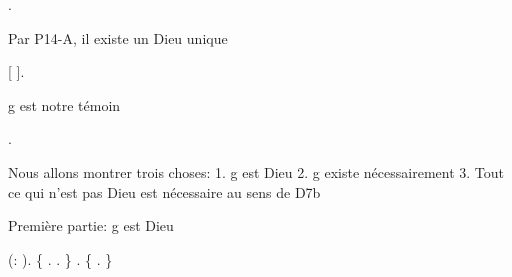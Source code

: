 \documentclass[10pt]{report}
\begin{document}
\begin{coqdoccode}
\coqdocnoindent
{}.\coqdoceol
\coqdocindent{1.00em}
\begin{coqdoccomment}
\coqdocindent{0.50em}
Par\coqdocindent{0.50em}
P14-A,\coqdocindent{0.50em}
il\coqdocindent{0.50em}
existe\coqdocindent{0.50em}
un\coqdocindent{0.50em}
Dieu\coqdocindent{0.50em}
unique\coqdocindent{0.50em}
\end{coqdoccomment}
\coqdoceol
\coqdocindent{1.00em}
   [ ].\coqdoceol
\coqdocemptyline
\coqdocindent{1.00em}
\begin{coqdoccomment}
\coqdocindent{0.50em}
g\coqdocindent{0.50em}
est\coqdocindent{0.50em}
notre\coqdocindent{0.50em}
témoin\coqdocindent{0.50em}
\end{coqdoccomment}
\coqdoceol
\coqdocindent{1.00em}
\coqdoctac{\ensuremath{\exists}} .\coqdoceol
\coqdocemptyline
\coqdocindent{1.00em}
\begin{coqdoccomment}
\coqdocindent{0.50em}
Nous\coqdocindent{0.50em}
allons\coqdocindent{0.50em}
montrer\coqdocindent{0.50em}
trois\coqdocindent{0.50em}
choses:\coqdoceol
\coqdocindent{2.50em}
1.\coqdocindent{0.50em}
g\coqdocindent{0.50em}
est\coqdocindent{0.50em}
Dieu\coqdoceol
\coqdocindent{2.50em}
2.\coqdocindent{0.50em}
g\coqdocindent{0.50em}
existe\coqdocindent{0.50em}
nécessairement\coqdoceol
\coqdocindent{2.50em}
3.\coqdocindent{0.50em}
Tout\coqdocindent{0.50em}
ce\coqdocindent{0.50em}
qui\coqdocindent{0.50em}
n'est\coqdocindent{0.50em}
pas\coqdocindent{0.50em}
Dieu\coqdocindent{0.50em}
est\coqdocindent{0.50em}
nécessaire\coqdocindent{0.50em}
au\coqdocindent{0.50em}
sens\coqdocindent{0.50em}
de\coqdocindent{0.50em}
D7b\coqdocindent{0.50em}
\end{coqdoccomment}
\coqdoceol
\coqdocemptyline
\coqdocindent{1.00em}
\begin{coqdoccomment}
\coqdocindent{0.50em}
Première\coqdocindent{0.50em}
partie:\coqdocindent{0.50em}
g\coqdocindent{0.50em}
est\coqdocindent{0.50em}
Dieu\coqdocindent{0.50em}
\end{coqdoccomment}
\coqdoceol
\coqdocindent{1.00em}
 (:  ).\coqdoceol
\coqdocindent{1.00em}
\{  . . \}\coqdoceol
\coqdocindent{1.00em}
\coqdoceol
\coqdocindent{1.00em}
. \{  . \}\coqdoceol
\coqdocindent{1.00em}
\coqdoceol
\coqdocindent{1.00em}
\begin{coqdoccomment}

\end{coqdoccomment}
\end{coqdoccode}
\end{document}
